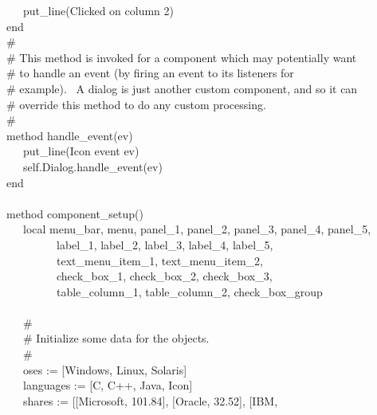 {\>   \ \ \ put\_line({\textquotedbl}Clicked on column
2{\textquotedbl}) \\
\>   end
\ \\
\>   \# \\
\>   \# This method is invoked for a component which may potentially want \\
\>   \# to handle an event (by firing an event to its listeners for\\
\>   \# example). \ A dialog is just another custom component, and so it can\\
\>   \# override this method to do any custom processing. \\
\>   \# \\
\>   method handle\_event(ev) \\
\>   \ \ \ put\_line({\textquotedbl}Icon event {\textquotedbl}
{\textbar}{\textbar} ev) \\
\>   \ \ \ self.Dialog.handle\_event(ev) \\
\>   end \\
\ \\
\>   method component\_setup() \\
\>   \ \ \ local menu\_bar, menu, panel\_1, panel\_2, panel\_3, panel\_4, panel\_5, \\
\>   \ \ \ \ \ \ \ \ \ label\_1, label\_2, label\_3, label\_4, label\_5, \\
\>   \ \ \ \ \ \ \ \ \ text\_menu\_item\_1, text\_menu\_item\_2, \\
\>   \ \ \ \ \ \ \ \ \ check\_box\_1, check\_box\_2, check\_box\_3, \\
\>   \ \ \ \ \ \ \ \ \ table\_column\_1, table\_column\_2, check\_box\_group \\
\ \\
\>   \ \ \ \# \\
\>   \ \ \ \# Initialize some data for the objects. \\
\>   \ \ \ \# \\
\>   \ \ \ oses := [{\textquotedbl}Windows{\textquotedbl},
{\textquotedbl}Linux{\textquotedbl},
{\textquotedbl}Solaris{\textquotedbl}] \\
\>   \ \ \ languages := [{\textquotedbl}C{\textquotedbl},
{\textquotedbl}C++{\textquotedbl}, {\textquotedbl}Java{\textquotedbl},
{\textquotedbl}Icon{\textquotedbl}] \\
\>   \ \ \ shares := [[{\textquotedbl}Microsoft{\textquotedbl},
{\textquotedbl}101.84{\textquotedbl}],
[{\textquotedbl}Oracle{\textquotedbl},
{\textquotedbl}32.52{\textquotedbl}],
[{\textquotedbl}IBM{\textquotedbl},
}
